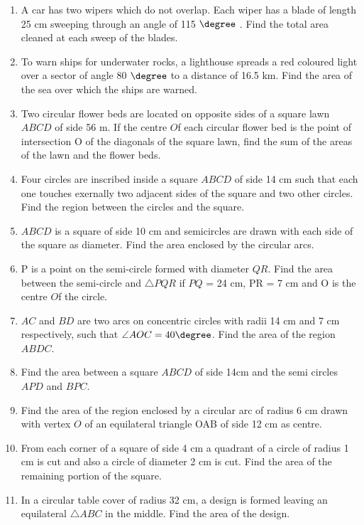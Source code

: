 \begin{enumerate}[label=\arabic*.,ref=\thesubsection.\theenumi]
\item A car has two wipers which do not overlap. Each wiper has a blade of length 25 cm sweeping through an angle of 115 $\degree$ . Find the total area cleaned at each sweep of the blades.
\item  To warn ships for underwater rocks, a lighthouse spreads a red coloured light over a sector of angle 80 $\degree$  to a distance of 16.5 km. Find the area of the sea over which the ships are warned.
	\iffalse
\item  A round table cover has six equal designs. If the radius of the cover is 28 cm, find the cost of making the designs at the rate of \rupee 0.35 per $cm^2$
. 
\fi
%
\item Two circular flower beds are located on opposite sides of a square lawn $ABCD$ of side 56 m. If the centre $O$f each circular flower bed is the point of intersection O of the diagonals of the square lawn, find the sum of the areas of the lawn and the flower beds.
%
\item Four circles are inscribed  inside a square $ABCD$ of side 14 cm such that each one touches exernally two adjacent sides of the square and two  other circles.  Find the region between the circles and the square.
\item  $ABCD$ is a square of side 10 cm and semicircles are drawn with each side of the square as diameter. Find the area enclosed by the circular arcs.
%
\item P is a point on the semi-circle formed with diameter $QR$. Find the area between the semi-circle and $\triangle PQR$ if $PQ$ = 24 cm, PR = 7 cm and O is the centre $O$f the circle.
\item $AC$ and $BD$ are two arcs on concentric circles with radii 14 cm and 7 cm respectively, such that $\angle AOC = 40\degree$.  Find the area of the region $ABDC$.
%
\item Find the area between a square $ABCD$ of side 14cm and the semi circles $APD$ and $BPC$.
\item Find the area of the  region enclosed by  a circular arc of radius 6 cm drawn with vertex $O$ of an equilateral triangle OAB of side 12 cm as centre.
%
\item From each corner of a square of side 4 cm a quadrant of a circle of radius 1 cm is cut and also a circle of diameter 2 cm is cut. Find the area of the remaining portion of the square.\item In a circular table cover of radius 32 cm, a design is formed leaving an equilateral $\triangle ABC$ in the middle. Find the area of the design.

\end{enumerate}
